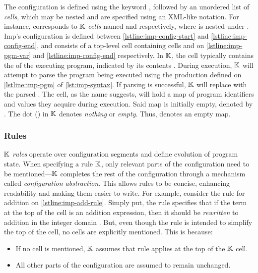 The configuration is defined using the keyword ,
followed by an unordered list of \emph{cells},
which may be nested and are specified using an XML-like notation.
For instance, 
corresponds to $\mathbb{K}$ \emph{cells} named
 and  respectively, where 
is nested under .
Imp's configuration is defined
between \autoref{lstline:imp-config-start} and \autoref{lstline:imp-config-end},
and consists of a top-level cell  containing cells
 and  on \autoref{lstline:imp-pgm-var} and
\autoref{lstline:imp-config-end} respectively. In $\mathbb{K}{}$,
the  cell typically contains the \AST{} of the executing
program, indicated by its contents .
During execution, $\mathbb{K}{}$ will attempt to parse the program being executed
using the production  defined on \autoref{lstline:imp-pgm} of
\autoref{lst:imp-syntax}. If parsing is successful, $\mathbb{K}{}$ will replace
 with the parsed \AST{}. The  cell,
as the name suggests, will hold a map of
program identifiers and values they acquire during execution.
Said map is initially empty, denoted by .
The dot () in $\mathbb{K}{}$ denotes \emph{nothing} or \emph{empty}.
Thus,  denotes an empty map.

\subsubsection{Rules}\label{sec:k-rules}
$\mathbb{K}$ \emph{rules} operate over configuration segments and define evolution of
program state. When specifying a rule $\mathbb{K}{}$, only relevant parts of the
configuration need to be mentioned---$\mathbb{K}{}$ completes the rest of the
configuration through a mechanism called \emph{configuration abstraction}.
This allows rules to be concise,
enhancing readability and making them easier to write. For example,
consider the rule for addition on \autoref{lstline:imp-add-rule}.
Simply put, the rule specifies that if the term at the top of the 
cell is an addition expression, then it should be \emph{rewritten} to
addition in the integer domain . But, even though the
rule is intended to simplify the top of the  cell,
no cells are explicitly mentioned. This is because:
\begin{itemize}
  \item If no cell is mentioned, $\mathbb{K}$ assumes that rule applies at the top of
    the $\mathbb{K}{}$ cell.
  \item All other parts of the configuration are assumed to remain unchanged.
\end{itemize}

